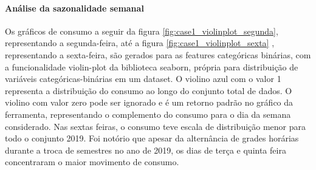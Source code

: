     	    \paragraph{Análise da sazonalidade semanal}
    	        Os gráficos de consumo a seguir da figura  \ref{fig:case1_violinplot_segunda}, representando a segunda-feira,  até a figura \ref{fig:case1_violinplot_sexta} , representando a sexta-feira,  são gerados para as features categóricas binárias, com a funcionalidade violin-plot da biblioteca seaborn, própria para distribuição de variáveis categóricas-binárias em um dataset.
    	        O violino azul com o valor 1 representa a distribuição do consumo ao longo do conjunto total de dados.
    	        O violino com valor zero pode ser ignorado e é um retorno padrão no gráfico da ferramenta, representando o complemento do consumo para o dia da semana considerado.
    	        Nas sextas feiras, o consumo teve escala de distribuição menor para todo o conjunto 2019. Foi notório que apesar da alternância de grades horárias durante a troca de semestres no ano de 2019, os dias de terça e quinta feira concentraram o maior movimento de consumo.
